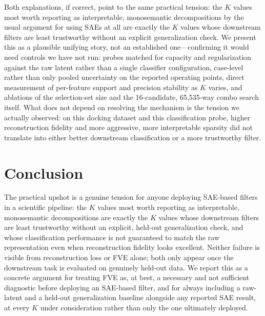 \documentclass{article}
\begin{document}
Both explanations, if correct, point to the same practical tension: the $K$ values most worth reporting as interpretable, monosemantic decompositions by the usual argument for using SAEs at all \citep{templeton2024,bricken2023} are exactly the $K$ values whose downstream filters are least trustworthy without an explicit generalization check. We present this as a plausible unifying story, not an established one---confirming it would need controls we have not run: probes matched for capacity and regularization against the raw latent rather than a single classifier configuration, case-level rather than only pooled uncertainty on the reported operating points, direct measurement of per-feature support and precision stability as $K$ varies, and ablations of the selection-set size and the 16-candidate, 65{,}535-way combo search itself. What does not depend on resolving the mechanism is the tension we actually observed: on this docking dataset and this classification probe, higher reconstruction fidelity and more aggressive, more interpretable sparsity did not translate into either better downstream classification or a more trustworthy filter.

\section{Conclusion}

The practical upshot is a genuine tension for anyone deploying SAE-based filters in a scientific pipeline: the $K$ values most worth reporting as interpretable, monosemantic decompositions are exactly the $K$ values whose downstream filters are least trustworthy without an explicit, held-out generalization check, and whose classification performance is not guaranteed to match the raw representation even when reconstruction fidelity looks excellent. Neither failure is visible from reconstruction loss or FVE alone; both only appear once the downstream task is evaluated on genuinely held-out data. We report this as a concrete argument for treating FVE as, at best, a necessary and not sufficient diagnostic before deploying an SAE-based filter, and for always including a raw-latent and a held-out generalization baseline alongside any reported SAE result, at every $K$ under consideration rather than only the one ultimately deployed.
\end{document}
